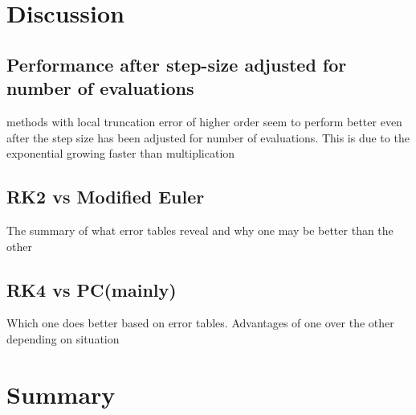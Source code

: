 \documentclass[11pt]{article}	%
\begin{document}
\section{Discussion}

\subsection{Performance after step-size adjusted for number of evaluations}
methods with local truncation error of higher order seem to perform better even after the step size has been adjusted for number of evaluations. 
This is due to the exponential growing faster than multiplication

\subsection{RK2 vs Modified Euler}
The summary of what error tables reveal and why one may be better than the other

\subsection{RK4 vs PC(mainly)}
Which one does better based on error tables. Advantages of one over
the other depending on situation 


\section{Summary}



\end{document}
